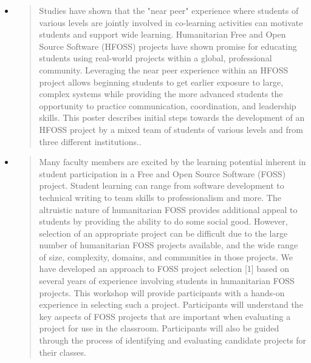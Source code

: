 \documentclass[11pt]{article}
\begin{document}
\begin{itemize}
\item \cite{Ellis:2013a}

\begin{quote}
Studies have shown that the "near peer" experience where students of various levels are jointly involved in co-learning activities can motivate students and support wide learning. Humanitarian Free and Open Source Software (HFOSS) projects have shown promise for educating students using real-world projects within a global, professional community. Leveraging the near peer experience within an HFOSS project allows beginning students to get earlier exposure to large, complex systems while providing the more advanced students the opportunity to practice communication, coordination, and leadership skills. This poster describes initial steps towards the development of an HFOSS project by a mixed team of students of various levels and from three different institutions..
\end{quote}

\item \cite{Ellis:2013b}

\begin{quote}
Many faculty members are excited by the learning potential inherent in student participation in a Free and Open Source Software (FOSS) project. Student learning can range from software development to technical writing to team skills to professionalism and more. The altruistic nature of humanitarian FOSS provides additional appeal to students by providing the ability to do some social good. However, selection of an appropriate project can be difficult due to the large number of humanitarian FOSS projects available, and the wide range of size, complexity, domains, and communities in those projects. We have developed an approach to FOSS project selection [1] based on several years of experience involving students in humanitarian FOSS projects. This workshop will provide participants with a hands-on experience in selecting such a project. Participants will understand the key aspects of FOSS projects that are important when evaluating a project for use in the classroom. Participants will also be guided through the process of identifying and evaluating candidate projects for their classes.
\end{quote}

\end{itemize}
\end{document}
